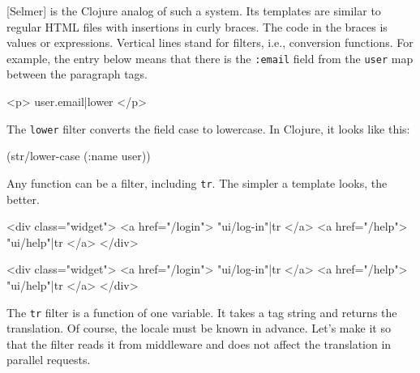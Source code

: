 
[Selmer] is the Clojure analog of such a system.
Its templates are similar to regular HTML files with insertions in curly braces.
The code in the braces is values or expressions.
Vertical lines stand for filters, i.e., conversion functions.
For example, the entry below means that there is the \verb|:email| field from the \verb|user| map between the paragraph tags.

\begin{english}
  \begin{htmldjango}
<p>{{ user.email|lower }}</p>
  \end{htmldjango}
\end{english}

\noindent
The \verb|lower| filter converts the field case to lowercase.
In Clojure, it looks like this:

\begin{english}
  \begin{clojure}
(str/lower-case (:name user))
  \end{clojure}
\end{english}

Any function can be a filter, including \verb|tr|.
The simpler a template looks, the better.

\ifx\DEVICETYPE\MOBILE

\begin{english}
  \begin{htmldjango}
<div class="widget">
  <a href="/login">
    {{ "ui/log-in"|tr }}
  </a>
  <a href="/help">
    {{ "ui/help"|tr }}
  </a>
</div>
  \end{htmldjango}
\end{english}

\else

\begin{english}
  \begin{htmldjango}
<div class="widget">
  <a href="/login">{{ "ui/log-in"|tr }}</a>
  <a href="/help">{{ "ui/help"|tr }}</a>
</div>
  \end{htmldjango}
\end{english}

\fi

The \verb|tr| filter is a function of one variable.
It takes a tag string and returns the translation. Of course, the locale must be known in advance.
Let's make it so that the filter reads it from middleware and does not affect the translation in parallel requests.

